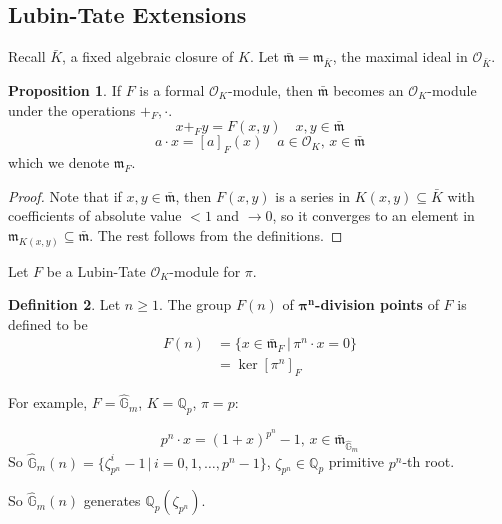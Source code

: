 \documentclass[a4paper]{article}
\theoremstyle{definition}
\newtheorem{definition}{Definition}
\theoremstyle{default}
\newtheorem{prop}[definition]{Proposition}
\theoremstyle{remark}
\begin{document}
\subsection{Lubin-Tate Extensions}
Recall $\bar{K}$, a fixed algebraic closure of $K$.
Let $\bar{\mathfrak{m}} = \mathfrak{m}_{\bar{K}}$,
the maximal ideal in $\mathcal{O}_{\bar{K}}$.

\begin{prop}
	If $F$ is a formal $\mathcal{O}_K$-module,
	then $\bar{\mathfrak{m}}$ becomes an $\mathcal{O}_K$-module under the operations $+_F, \cdot$.
	$$x +_F y = F(x, y) \quad x,y \in \bar{\mathfrak{m}}$$
	$$a \cdot x = [a]_F(x) \quad a \in \mathcal{O}_K,\, x \in \bar{\mathfrak{m}}$$
	which we denote $\mathfrak{m}_F$.
\end{prop}
\begin{proof}
	Note that if $x, y \in \bar{\mathfrak{m}}$,
	then $F(x, y)$ is a series in $K(x, y) \subseteq \bar{K}$
	with coefficients of absolute value $<1$ and $\to 0$,
	so it converges to an element in $\mathfrak{m}_{K(x, y)} \subseteq \bar{\mathfrak{m}}$.
	The rest follows from the definitions.
\end{proof}

Let $F$ be a Lubin-Tate $\mathcal{O}_K$-module for $\pi$.

\begin{definition}
	Let $n\geq 1$. The group $F(n)$ of $\mathbf{\pi^n}$\textbf{-division points} of $F$
	is defined to be
	\begin{align*}
		F(n) &= \{x \in \bar{\mathfrak{m}}_F \,|\, \pi^n \cdot x = 0\} \\
		&= \ker [\pi^n]_F
	\end{align*}
\end{definition}

For example, $F=\hat{\mathbb{G}}_m$, $K=\mathbb{Q}_p$, $\pi = p$:

$$p^n \cdot x = (1+x)^{p^n} - 1,\, x \in \bar{\mathfrak{m}}_{\hat{\mathbb{G}}_m}$$
So $\hat{\mathbb{G}}_m(n) = \{\zeta_{p^n}^i - 1 \,|\, i =0, 1, \dots, p^n-1 \}$,
$\zeta_{p^n} \in \mathbb{Q}_p$ primitive $p^n$-th root.

So $\hat{\mathbb{G}}_m(n)$ generates $\mathbb{Q}_p(\zeta_{p^n})$.
\end{document}
